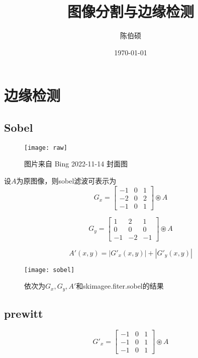 \documentclass{myreport}
\title{图像分割与边缘检测}
\author{陈伯硕}
\date{\today}
\begin{document}
\maketitle

\section{边缘检测}
  \subsection{Sobel}
      \begin{figure}[H]
        \centering
        \texttt{[image: raw]}
        \caption{图片来自 Bing 2022-11-14 封面图}
        \label{fig:fish}
      \end{figure}

      设$A$为原图像，则sobel滤波可表示为
      $$
        G_x = \begin{bmatrix}
            -1 & 0 & 1 \\
            -2 & 0 & 2 \\
            -1 & 0 & 1
        \end{bmatrix}
        \circledast A 
      $$
      
      $$
        G_y = \begin{bmatrix}
            1 & 2 & 1 \\
            0 & 0 & 0 \\
            -1 & -2 & -1
        \end{bmatrix}
        \circledast A 
      $$
      
      $$
        A'(x,y) = |G'_x(x,y)| + |G'_y(x,y)| 
      $$

      \begin{figure}[H]
        \centering
        \texttt{[image: sobel]}
        \caption{依次为$G_x, G_y, A'$和skimagee.fiter.sobel的结果}
        \label{fig:sobel}
      \end{figure}

  \subsection{prewitt}
      $$
        G'_x = \begin{bmatrix}
            -1 & 0 & 1 \\
            -1 & 0 & 1 \\
            -1 & 0 & 1
        \end{bmatrix}
        \circledast A 
      $$
      
\end{document}
